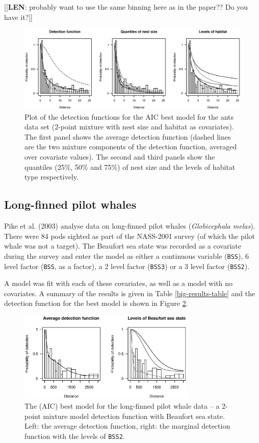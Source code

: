 \documentclass[useAMS,referee, usegraphicx]{biom}
\begin{document}
[[\textbf{LEN}: probably want to use the same binning here as in the paper?? Do you have it?]]

\begin{figure}
\centering
\includegraphics[width=\textwidth]{analyses/ants-nesthab.eps}
\caption{Plot of the detection functions for the AIC best model for the ants data set (2-point mixture with nest size and habitat as covariates). The first panel shows the average detection function (dashed lines are the two mixture components of the detection function, averaged over covariate values). The second and third panels show the quantiles (25\%, 50\% and 75\%) of nest size and the levels of habitat type respectively.}
\label{ants-nesthab}
\end{figure}


\subsection{Long-finned pilot whales}

Pike et al. (2003) analyse data on long-finned pilot whales (\textit{Globicephala melas}). There were 84 pods sighted as part of the NASS-2001 survey (of which the pilot whale was not a target). The Beaufort sea state was recorded as a covariate during the survey and enter the model as either a continuous variable (\texttt{BSS}), 6 level factor (\texttt{BSS}, as a factor), a 2 level factor (\texttt{BSS3}) or a 3 level factor (\texttt{BSS2}).

A model was fit with each of these covariates, as well as a model with no covariates. A summary of the results is given in Table \ref{big-results-table} and the detection function for the best model is shown in Figure \ref{danpike-detfct}.

\begin{figure}
\centering
\includegraphics[width=0.75\textwidth]{analyses/danpike-bss2.eps}
\caption{The (AIC) best model for the long-finned pilot whale data -- a 2-point mixture model detection function with Beaufort sea state. Left: the average detection function, right: the marginal detection function with the levels of \texttt{BSS2}.}
\label{danpike-detfct}
\end{figure}
\end{document}
